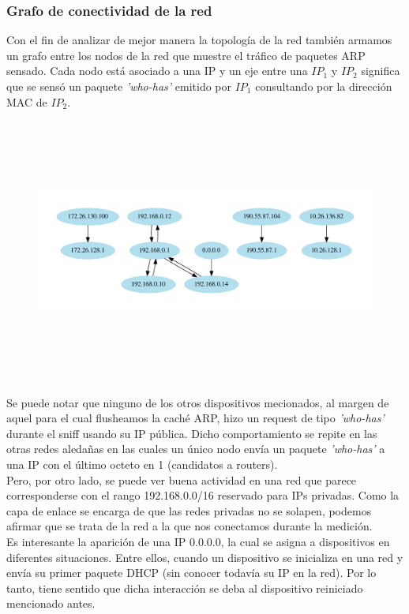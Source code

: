 \newpage
\subsubsection{Grafo de conectividad de la red}
Con el fin de analizar de mejor manera la topología de la red también armamos un grafo entre los nodos de la red que muestre el tráfico de paquetes ARP sensado. Cada nodo está asociado a una IP y un eje entre una $IP_1$ y $IP_2$ significa que se sensó un paquete \emph{'who-has'} emitido por $IP_1$ consultando por la dirección MAC de $IP_2$.

\begin{figure}[H]
	\includegraphics[width=15cm, height=8.7cm]{../img/red-Tatooine-Lan.pdf}
\end{figure}

Se puede notar que ninguno de los otros dispositivos mecionados, al margen de aquel para el cual flusheamos la caché ARP, hizo un request de tipo \emph{'who-has'} durante el sniff usando su IP pública. Dicho comportamiento se repite en las otras redes aledañas en las cuales un único nodo envía un paquete \emph{'who-has'} a una IP con el último octeto en 1 (candidatos a routers).
\\

Pero, por otro lado, se puede ver buena actividad en una red que parece corresponderse con el rango 192.168.0.0/16 reservado para IPs privadas. Como la capa de enlace se encarga de que las redes privadas no se solapen, podemos afirmar que se trata de la red a la que nos conectamos durante la medición.
\\

Es interesante la aparición de una IP 0.0.0.0, la cual se asigna a dispositivos en diferentes situaciones. Entre ellos, cuando un dispositivo se inicializa en una red y envía su primer paquete DHCP (sin conocer todavía su IP en la red). Por lo tanto, tiene sentido que dicha interacción se deba al dispositivo reiniciado mencionado antes.

